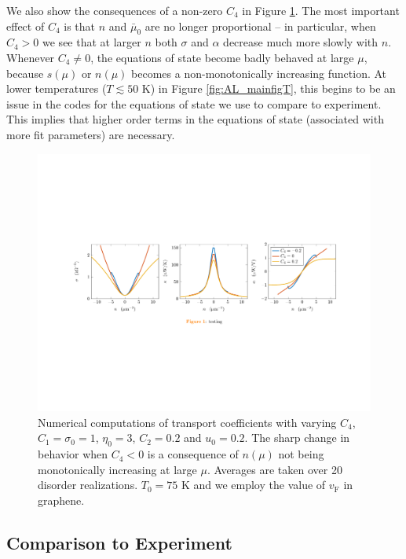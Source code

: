 We also show the consequences of a non-zero $C_4$ in Figure \ref{fig:AL_c4fig}.   The most important effect of $C_4$ is that $n$ and $\bar\mu_0$ are no longer proportional -- in particular, when $C_4>0$ we see that at larger $n$ both $\sigma$ and $\alpha$ decrease much more slowly with $n$.   Whenever $C_4\ne 0$, the equations of state become badly behaved at large $\mu$,  because $s(\mu)$ or $n(\mu)$ becomes a non-monotonically increasing function.  At lower temperatures ($T\lesssim 50$ K) in Figure \ref{fig:AL_mainfigT}, this begins to be an issue in the codes for the equations of state  we use to compare to experiment.  This implies that higher order terms in the equations of state (associated with more fit parameters) are necessary.

\begin{figure}[t]
\centering
\includegraphics[width=\textwidth]{figures/hydro_theory/c4plot.pdf}
\caption{Numerical computations of transport coefficients with varying $C_4$, $C_1=\sigma_0=1$, $\eta_0=3$, $C_2=0.2$ and $u_0=0.2$.    The sharp change in behavior when $C_4<0$ is a consequence of $n(\mu)$ not being monotonically increasing at large $\mu$.    Averages are taken over 20 disorder realizations.  $T_0=75$ K and we employ the value of $v_{\mathrm{F}}$ in graphene.  }
\label{fig:AL_c4fig}
\end{figure}


\subsection{Comparison to Experiment}

